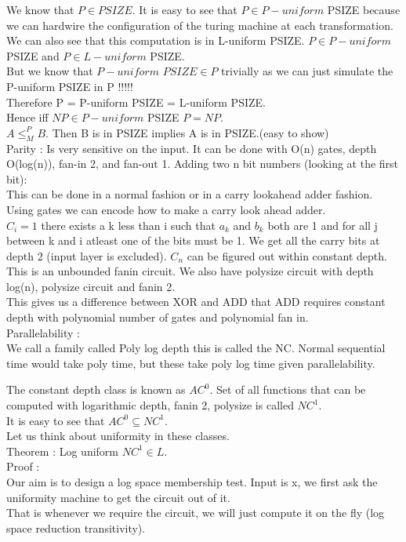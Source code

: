 \documentclass[solution,addpoints,12pt]{exam}
\begin{document}
We know that $P \in PSIZE$. It is easy to see that $P \in P-uniform$ PSIZE
because we can hardwire the configuration of the turing machine at
each transformation. We can also see that this computation is in
L-uniform PSIZE. $P \in P-uniform$ PSIZE and $P \in L-uniform$ PSIZE.\\
But we know that $P-uniform$ $PSIZE \in P$ trivially as we can just
simulate the P-uniform PSIZE in P !!!!!\\
Therefore P = P-uniform PSIZE = L-uniform PSIZE.\\
Hence iff $NP \in P-uniform$ PSIZE $P = NP$.\\

$A \le_{M}^{P} B$. Then B is in PSIZE implies A is in PSIZE.(easy to show)\\

Parity : Is very sensitive on the input. It can be done
with O(n) gates, depth O(log(n)), fan-in 2, and fan-out 1.
Adding two n bit numbers (looking at the first bit):\\
This can be done in a normal fashion or in a carry lookahead adder fashion.\\
Using gates we can encode how to make a carry look ahead adder.\\
$C_i = 1$ there exists a k less than i such that $a_k$ and $b_k$ both are
1 and for all j between k and i atleast one of the bits must be 1.
We get all the carry bits at depth 2 (input layer is excluded). $C_n$
can be figured out within constant depth. This is an unbounded
fanin circuit. We also have polysize circuit with depth log(n), polysize
circuit and fanin 2.\\

This gives us a difference between XOR and ADD that ADD requires constant
depth with polynomial number of gates and polynomial fan in.\\

Parallelability :\\
We call a family called Poly log depth this is called the NC. Normal
sequential time would take poly time, but these take poly log time
given parallelability.

The constant depth class is known as ${AC}^0$.
Set of all functions that can be computed with logarithmic depth,
fanin 2, polysize is called ${NC}^1$.\\
It is easy to see that ${AC}^0 \subseteq {NC}^1$.\\
Let us think about uniformity in these classes.\\
Theorem : Log uniform ${NC}^1 \in L$.\\
Proof :\\
Our aim is to design a log space membership test. Input is
x, we first ask the uniformity machine to get the circuit out of it.\\
That is whenever we require the circuit, we will just compute it
on the fly (log space reduction transitivity).\\
\end{document}
